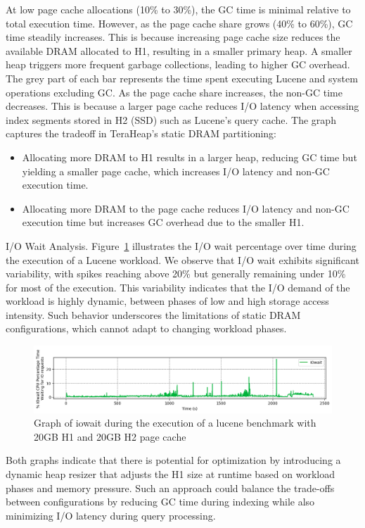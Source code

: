 At low page cache allocations (10\% to 30\%), the GC time is minimal relative to total execution time. However, as the page cache share grows (40\% to 60\%), GC time steadily increases. This is because increasing page cache size reduces the available DRAM allocated to H1, resulting in a smaller primary heap. A smaller heap triggers more frequent garbage collections, leading to higher GC overhead.
The grey part of each bar represents the time spent executing Lucene and system operations excluding GC. As the page cache share increases, the non-GC time decreases. This is because a larger page cache reduces I/O latency when accessing index segments stored in H2 (SSD) such as Lucene's query cache.
The graph captures the tradeoff in TeraHeap’s static DRAM partitioning: \vspace{-0.5em} 
\begin{itemize} 
  \item Allocating more DRAM to H1 results in a larger heap, reducing GC time but yielding a smaller page cache, which increases I/O latency and non-GC execution time.
  \item Allocating more DRAM to the page cache reduces I/O latency and non-GC execution time but increases GC overhead due to the smaller H1.
\end{itemize} 
\vspace{-0.5em}

I/O Wait Analysis. Figure~\ref{fig:iowait} illustrates the I/O wait percentage over time during the execution of a Lucene workload. We observe that 
I/O wait exhibits significant variability, with spikes reaching above 20\% but generally remaining under 10\% for most of the 
execution. This variability indicates that the I/O demand of the workload is highly dynamic, between phases of low and high storage access 
intensity. Such behavior underscores the limitations of static DRAM configurations,
which cannot adapt to changing workload phases. 


\begin{figure}[htbp]
  \centering
  \includegraphics[width=1\columnwidth]{fig/iow_cpu.png}
  \caption{Graph of iowait during the execution of a lucene benchmark with 20GB H1 and 20GB H2 page cache}
  \label{fig:iowait}
\end{figure}

Both graphs indicate that there is potential for optimization by introducing a dynamic heap resizer that adjusts the H1 size at runtime based on workload phases and memory pressure. Such an approach could balance the trade-offs between configurations by reducing GC time during indexing while also minimizing I/O latency during query processing. 
